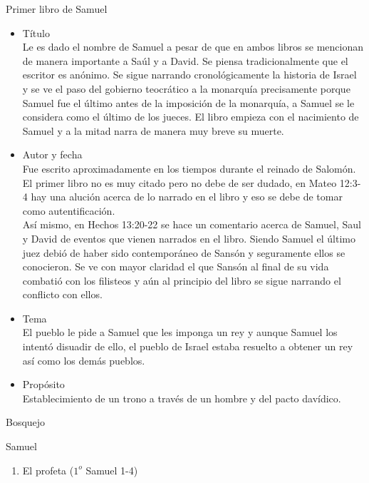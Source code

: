 %
%
%
\begin{section}{Primer libro de Samuel}
	\begin{itemize}
		\item Título\\
			Le es dado el nombre de Samuel a pesar de que en ambos libros se mencionan de manera importante a Saúl y a David. Se piensa tradicionalmente que el escritor es anónimo. Se sigue narrando cronológicamente la historia de Israel y se ve el paso del gobierno teocrático a la monarquía precisamente porque Samuel fue el último antes de la imposición de la monarquía, a Samuel se le considera como el último de los jueces. El libro empieza con el nacimiento de Samuel y a la mitad narra de manera muy breve su muerte.
		\item Autor y fecha\\
			Fue escrito aproximadamente en los tiempos durante el reinado de Salomón. El primer libro no es muy citado pero no debe de ser dudado, en Mateo 12:3-4 hay una alución acerca de lo narrado en el libro y eso se debe de tomar como autentificación.\\
			Así mismo, en Hechos 13:20-22 se hace un comentario acerca de Samuel, Saul y David de eventos que vienen narrados en el libro. Siendo Samuel el último juez debió de haber sido contemporáneo de Sansón y seguramente ellos se conocieron. Se ve con mayor claridad el que Sansón al final de su vida combatió con los filisteos y aún al principio del libro se sigue narrando el conflicto con ellos.
		\item Tema\\
			El pueblo le pide a Samuel que les imponga un rey y aunque Samuel los intentó disuadir de ello, el pueblo de Israel estaba resuelto a obtener un rey así como los demás pueblos.
		\item Propósito\\
			Establecimiento de un trono a través de un hombre y del pacto davídico.
	\end{itemize}
	\begin{subsection}{Bosquejo}
		\begin{subsubsection}{Samuel}
			\begin{enumerate}
				\item El profeta ($1^{o}$ Samuel 1-4)\\

\end{enumerate}
\end{subsubsection}
\end{subsection}
\end{section}
